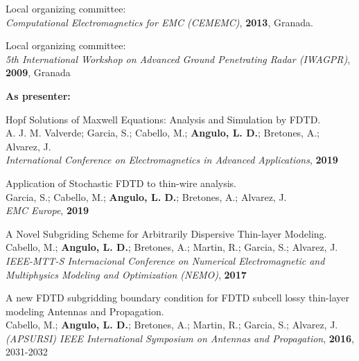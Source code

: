 \documentclass[margin,line]{res}
\begin{document}
\begin{minipage}{\textwidth}
	Local organizing committee:\\
	\textit{Computational Electromagnetics for EMC (CEMEMC)}, \textbf{2013}, Granada.
\end{minipage}

\begin{minipage}{\textwidth}
		Local organizing committee:\\
	\textit{5th International Workshop on Advanced Ground Penetrating Radar (IWAGPR)}, \textbf{2009}, Granada
\end{minipage}

\textbf{As presenter:}\\[0.5cm]
\begin{minipage}{\textwidth}
	Hopf Solutions of Maxwell Equations: Analysis and Simulation by FDTD.\\
	A. J. M. Valverde; Garcia, S.; Cabello, M.; \textbf{Angulo, L. D.}; Bretones, A.; Alvarez, J.\\
	\textit{International Conference on Electromagnetics in Advanced Applications}, \textbf{2019}
\end{minipage}

\begin{minipage}{\textwidth}
	Application of Stochastic FDTD to thin-wire analysis.\\
	Garcia, S.; Cabello, M.; \textbf{Angulo, L. D.}; Bretones, A.; Alvarez, J.\\
	\textit{EMC Europe}, \textbf{2019}
\end{minipage}

\begin{minipage}{\textwidth}
	A Novel Subgriding Scheme for Arbitrarily Dispersive Thin-layer Modeling.\\
	Cabello, M.; \textbf{Angulo, L. D.}; Bretones, A.; Martin, R.; Garcia, S.; Alvarez, J.\\
	\textit{IEEE-MTT-S Internacional Conference on Numerical Electromagnetic and Multiphysics Modeling and Optimization (NEMO)}, \textbf{2017}
\end{minipage}

\begin{minipage}{\textwidth}
	A new FDTD subgridding boundary condition for FDTD subcell lossy thin-layer modeling Antennas and Propagation.\\
	Cabello, M.; \textbf{Angulo, L. D.}; Bretones, A.; Martin, R.; Garcia, S.; Alvarez, J.\\
	\textit{(APSURSI) IEEE International Symposium on Antennas and Propagation}, \textbf{2016}, 2031-2032
\end{minipage}
\end{document}

